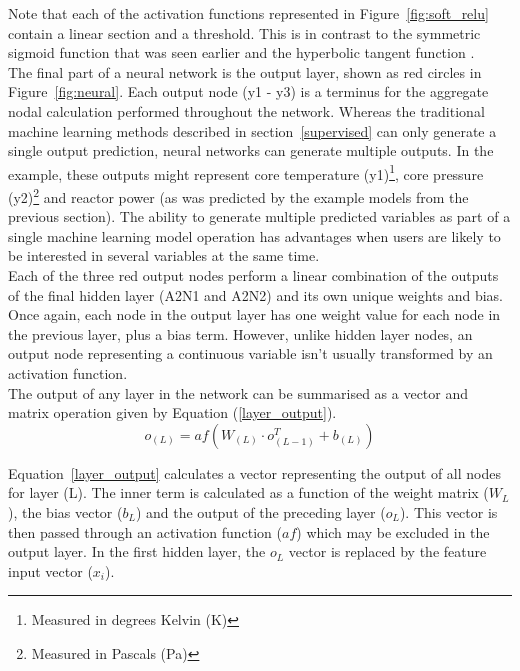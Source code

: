 \noindent
Note that each of the activation functions represented in Figure~\ref{fig:soft_relu} contain a linear section and a threshold. This is in contrast to the symmetric sigmoid function that was seen earlier and the hyperbolic tangent function \cite{anastassiou2011multivariate}. \\

\noindent
The final part of a neural network is the output layer, shown as red circles in Figure~\ref{fig:neural}. Each output node (y1 - y3) is a terminus for the aggregate nodal calculation performed throughout the network. Whereas the traditional machine learning methods described in section~\ref{supervised} can only generate a single output prediction, neural networks can generate multiple outputs.  In the example, these outputs might represent core temperature (y1)\footnote{Measured in degrees Kelvin (K)}, core pressure (y2)\footnote{Measured in Pascals (Pa)} and reactor power (as was predicted by the example models from the previous section). The ability to generate multiple predicted variables as part of a single machine learning model operation has advantages when users are likely to be interested in several variables at the same time. 
\\

\noindent
Each of the three red output nodes perform a linear combination of the outputs of the final hidden layer (A2N1 and A2N2) and its own unique weights and bias. Once again, each node in the output layer has one weight value for each node in the previous layer, plus a bias term. However, unlike hidden layer nodes, an output node representing a continuous variable isn't usually transformed by an activation function.
\\

\noindent 
The output of any layer in the network can be summarised as a vector and matrix operation given by Equation (\ref{layer_output}). \\ 

\begin{equation} \label{layer_output}
	o_{(L)} = af(W_{(L)} \cdot o_{(L-1)}^T + b_{(L)})
\end{equation}

\noindent
Equation~\ref{layer_output} calculates a vector representing the output of all nodes for layer (L). The inner term is calculated as a function of the weight matrix ($W_{L}$), the bias vector ($b_{L}$) and the output of the preceding layer ($o_{L}$). This vector is then passed through an activation function ($af$) which may be excluded in the output layer. In the first hidden layer, the $o_{L}$ vector is replaced by the feature input vector ($x_i$). \\

